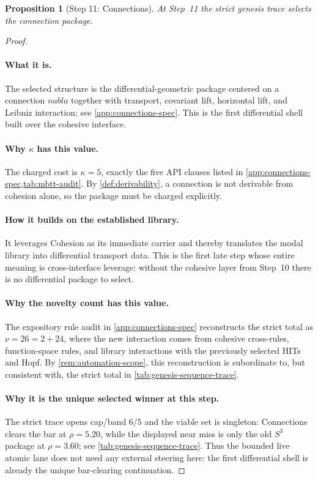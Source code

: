 \documentclass[11pt,a4paper]{article}
\def\nabla{nabla}%
\theoremstyle{plain}
\newtheorem{proposition}[theorem]{Proposition}
\theoremstyle{definition}
\theoremstyle{remark}
\begin{document}
\begin{proposition}[Step 11: Connections]
\label{prop:genesis-step11}
At Step~11 the strict genesis trace selects the connection package.
\end{proposition}

\begin{proof}
\paragraph{What it is.}
The selected structure is the differential-geometric package centered on a
connection $\nabla$ together with transport, covariant lift, horizontal lift,
and Leibniz interaction; see \cref{app:connections-spec}.
This is the first differential shell built over the cohesive interface.

\paragraph{Why $\kappa$ has this value.}
The charged cost is $\kappa=5$, exactly the five API clauses listed in
\cref{app:connections-spec,tab:mbtt-audit}.
By \cref{def:derivability}, a connection is not derivable from cohesion alone,
so the package must be charged explicitly.

\paragraph{How it builds on the established library.}
It leverages Cohesion as its immediate carrier and thereby translates the modal
library into differential transport data.
This is the first late step whose entire meaning is cross-interface leverage:
without the cohesive layer from Step~10 there is no differential package to
select.

\paragraph{Why the novelty count has this value.}
The expository rule audit in \cref{app:connections-spec} reconstructs the strict
total as $\nu=26=2+24$, where the new interaction comes from cohesive
cross-rules, function-space rules, and library interactions with the previously
selected HITs and Hopf.
By \cref{rem:automation-scope}, this reconstruction is subordinate to, but
consistent with, the strict total in \cref{tab:genesis-sequence-trace}.

\paragraph{Why it is the unique selected winner at this step.}
The strict trace opens cap/band $6/5$ and the viable set is singleton:
Connections clears the bar at $\rho=5.20$, while the displayed near miss is only
the old $S^3$ package at $\rho=3.60$; see
\cref{tab:genesis-sequence-trace}.
Thus the bounded live atomic lane does not need any external steering here: the first
differential shell is already the unique bar-clearing continuation.
\end{proof}
\end{document}
